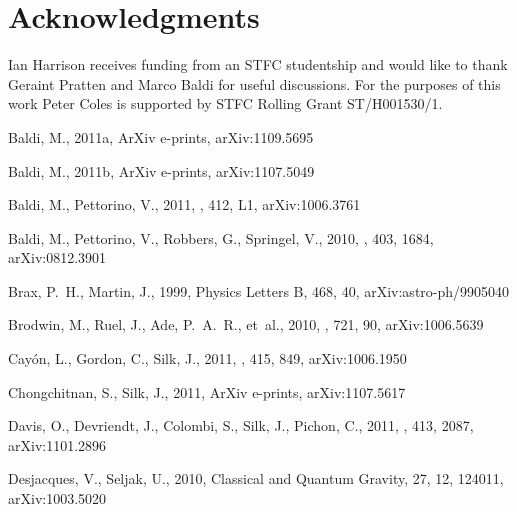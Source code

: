 \documentclass[twocolumn,useAMS,usenatbib,usegraphicx]{mn2e}
\begin{document}
\section*{Acknowledgments}
Ian Harrison receives funding from an STFC studentship and would
like to thank Geraint Pratten and Marco Baldi for useful
discussions. For the purposes of this work Peter Coles is supported
by STFC Rolling Grant ST/H001530/1.

\begin{thebibliography}{37}
\providecommand{\natexlab}[1]{#1}
\providecommand{\url}[1]{\texttt{#1}}
\providecommand{\urlprefix}{URL }
\providecommand{\eprint}[1][]{\url{#1}}

\bibitem[{{Baldi}(2011{\natexlab{a}})}]{Baldi2011a}
{Baldi}, M., 2011{\natexlab{a}}, ArXiv e-prints, \eprint arXiv:{1109.5695}

\bibitem[{{Baldi}(2011{\natexlab{b}})}]{Baldi2011}
{Baldi}, M., 2011{\natexlab{b}}, ArXiv e-prints, \eprint arXiv:{1107.5049}

{Baldi}, M., {Pettorino}, V., 2011, \mnras, 412, L1, \eprint arXiv:{1006.3761}

{Baldi}, M., {Pettorino}, V., {Robbers}, G., {Springel}, V., 2010, \mnras, 403,
  1684, \eprint arXiv:{0812.3901}

{Brax}, P.~H., {Martin}, J., 1999, Physics Letters B, 468, 40,
  \eprint{arXiv:astro-ph/9905040}

{Brodwin}, M., {Ruel}, J., {Ade}, P.~A.~R., et~al., 2010, \apj, 721, 90,
  \eprint arXiv:{1006.5639}

{Cay{\'o}n}, L., {Gordon}, C., {Silk}, J., 2011, \mnras, 415, 849, \eprint
  arXiv:{1006.1950}

{Chongchitnan}, S., {Silk}, J., 2011, ArXiv e-prints, \eprint arXiv:{1107.5617}

{Davis}, O., {Devriendt}, J., {Colombi}, S., {Silk}, J., {Pichon}, C., 2011,
  \mnras, 413, 2087, \eprint arXiv:{1101.2896}

{Desjacques}, V., {Seljak}, U., 2010, Classical and Quantum Gravity, 27, 12,
  124011, \eprint arXiv:{1003.5020}


\end{thebibliography}
\end{document}
